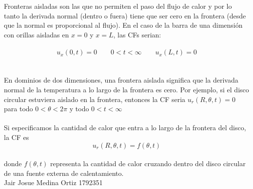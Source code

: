 \documentclass[10pt,a4paper]{report}
\begin{document}
\\\\ Fronteras aisladas son las que no permiten el paso del flujo de calor y por lo tanto la derivada normal (dentro o fuera) tiene que ser cero en la frontera (desde que la normal es proporcional al flujo). En el caso de la barra de una dimensión con orillas aisladas en $x=0$ y $x=L$, las CFs serian:
\\\\$$\displaystyle u_x(0,t) = 0 \quad \quad  0<t<
\infty
\quad \quad
u_x(L,t) = 0$$
\\\\ En dominios de dos dimensiones, una frontera aislada significa que la derivada normal de la temperatura a lo largo de la frontera es cero. Por ejemplo, si el disco circular estuviera aislado en la frontera, entonces la CF seria $u_r(R, \theta, t)=0$ para todo $0< \theta < 2 \pi$ y todo $0<t< \infty$ 
\\\\Si especificamos la cantidad de calor que entra a lo largo de la frontera del disco, la CF es 
\\ $$u_r(R , \theta, t)= f(\theta, t)$$
\\ donde $f(\theta, t)$ representa la cantidad de calor cruzando dentro del disco circular de una fuente externa de calentamiento.
\\ \Large Jair Josue Medina Ortiz 1792351 
\end{document}
